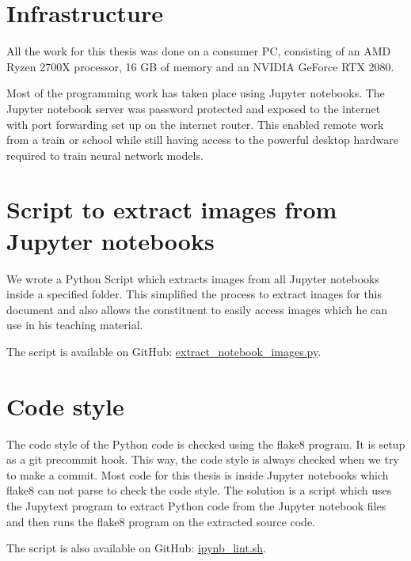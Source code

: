 \label{chapter_infrastructure}
\section{Infrastructure}
All the work for this thesis was done on a consumer PC, consisting of an AMD Ryzen 2700X processor, 16 GB of memory and an NVIDIA GeForce RTX 2080.

Most of the programming work has taken place using Jupyter notebooks. The Jupyter notebook server was password protected and exposed to the internet with port forwarding set up on the internet router. This enabled remote work from a train or school while still having access to the powerful desktop hardware required to train neural network models.

\section{Script to extract images from Jupyter notebooks}

We wrote a Python Script which extracts images from all Jupyter notebooks inside a specified folder. This simplified the process to extract images for this document and also allows the constituent to easily access images which he can use in his teaching material.

The script is available on GitHub: \href{https://github.com/andef4/thesis-code/blob/master/extract_notebook_images.py}{extract\_notebook\_images.py}.

\section{Code style}
The code style of the Python code is checked using the flake8 program. It is setup as a git precommit hook. This way, the code style is always checked when we try to make a commit. Most code for this thesis is inside Jupyter notebooks which flake8 can not parse to check the code style. The solution is a script which uses the Jupytext \cite{jupytext} program to extract Python code from the Jupyter notebook files and then runs the flake8 program on the extracted source code.

The script is also available on GitHub: \href{https://github.com/andef4/thesis-code/blob/master/ipynb_lint.sh}{ipynb\_lint.sh}.
